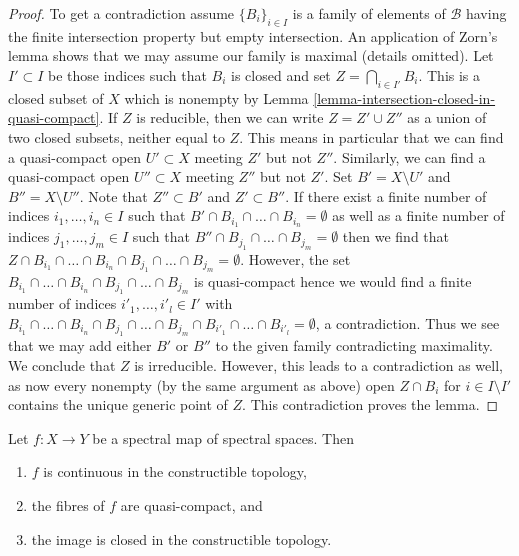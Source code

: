 \begin{proof}
\medskip\noindent
To get a contradiction assume $\{B_i\}_{i \in I}$ is a family
of elements of $\mathcal{B}$ having the finite intersection property
but empty intersection. An application of Zorn's lemma shows that we
may assume our family is maximal (details omitted).
Let $I' \subset I$ be those indices such that
$B_i$ is closed and set $Z = \bigcap_{i \in I'} B_i$.
This is a closed subset of $X$ which is nonempty by Lemma
\ref{lemma-intersection-closed-in-quasi-compact}.
If $Z$ is reducible, then we can write $Z = Z' \cup Z''$
as a union of two closed subsets, neither equal to $Z$. This means in
particular that we can find a quasi-compact open $U' \subset X$ meeting
$Z'$ but not $Z''$. Similarly, we can find a quasi-compact open
$U'' \subset X$ meeting $Z''$ but not $Z'$. Set $B' = X \setminus U'$ and
$B'' = X \setminus U''$. Note that $Z'' \subset B'$ and $Z' \subset B''$.
If there exist a finite number of indices $i_1, \ldots, i_n \in I$ such
that $B' \cap B_{i_1} \cap \ldots \cap B_{i_n} = \emptyset$
as well as a finite number of indices $j_1, \ldots, j_m \in I$ such that
$B'' \cap B_{j_1} \cap \ldots \cap B_{j_m} = \emptyset$
then we find that
$Z \cap B_{i_1} \cap \ldots \cap B_{i_n} \cap B_{j_1} \cap \ldots \cap B_{j_m}
= \emptyset$.
However, the set
$B_{i_1} \cap \ldots \cap B_{i_n} \cap B_{j_1} \cap \ldots \cap B_{j_m}$
is quasi-compact hence we would find a finite number of
indices $i'_1, \ldots, i'_l \in I'$ with
$B_{i_1} \cap \ldots \cap B_{i_n} \cap B_{j_1} \cap \ldots \cap
B_{j_m} \cap B_{i'_1} \cap \ldots \cap B_{i'_l} = \emptyset$, a contradiction.
Thus we see that we may add either $B'$ or $B''$ to the given family
contradicting maximality. We conclude that $Z$ is irreducible. However,
this leads to a contradiction as well, as now every nonempty (by the
same argument as above) open $Z \cap B_i$ for $i \in I \setminus I'$
contains the unique generic point of $Z$. This contradiction proves the lemma.
\end{proof}

\begin{lemma}
\label{lemma-fibres-spectral-map-quasi-compact}
Let $f : X \to Y$ be a spectral map of spectral spaces. Then
\begin{enumerate}
\item $f$ is continuous in the constructible topology,
\item the fibres of $f$ are quasi-compact, and
\item the image is closed in the constructible topology.
\end{enumerate}
\end{lemma}

